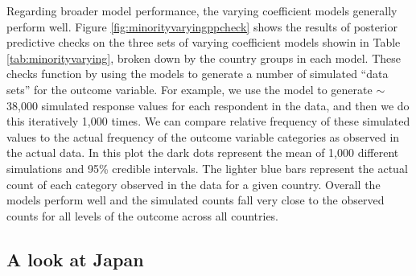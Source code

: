 Regarding broader model performance, the varying coefficient models generally perform well. Figure \ref{fig:minorityvaryingppcheck} shows the results of posterior predictive checks on the three sets of varying coefficient models showin in Table \ref{tab:minorityvarying}, broken down by the country groups in each model. These checks function by using the models to generate a number of simulated ``data sets'' for the outcome variable. For example, we use the model to generate $\sim$ 38,000 simulated response values for each respondent in the data, and then we do this iteratively 1,000 times. We can compare relative frequency of these simulated values to the actual frequency of the outcome variable categories as observed in the actual data. In this plot the dark dots represent the mean of 1,000 different simulations and 95\% credible intervals. The lighter blue bars represent the actual count of each category observed in the data for a given country. Overall the models perform well and the simulated counts fall very close to the observed counts for all levels of the outcome across all countries.




\subsection*{A look at Japan}


